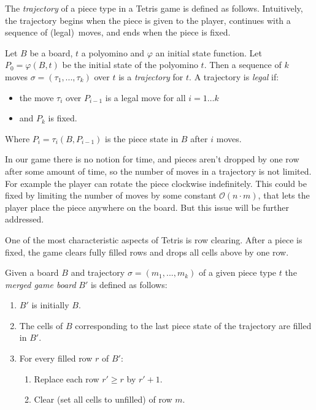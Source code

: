\vspace{10px}
The \emph{trajectory} of a piece type in a Tetris game is defined as follows. Intuitively, the trajectory begins when the piece is given to the player, continues with a sequence of (legal)~moves, and ends when the piece is fixed.  

\begin{definition} 
  Let $B$ be a board, $t$ a polyomino and $\varphi$ an initial state function. Let $P_0 = \varphi(B,t)$ be the initial state of the polyomino $t$. Then a sequence of $k$ moves $\sigma = (\tau_1, ..., \tau_k)$ over $t$ is a \emph{trajectory} for $t$. A trajectory is \emph{legal}  if:

 \begin{itemize}
   \item the move $\tau_{i}$ over $P_{i-1}$ is a legal move for all $i = 1 \dots k$
  \item and $P_k$ is fixed.
 \end{itemize}
 
 Where $P_{i} = \tau_{i}(B,P_{i-1})$ is the piece state in $B$ after $i$ moves.
\end{definition}

In our game there is no notion for time, and pieces aren't dropped by one row after some amount of time, so the number of moves in a trajectory is not limited. For example the player can rotate the piece clockwise indefinitely. This could be fixed by limiting the number of moves by some constant $\mathcal{O}(n \cdot m)$, that lets the player place the piece anywhere on the board. But this issue will be further addressed.

\vspace{1em}

One of the most characteristic aspects of Tetris is row clearing. After a piece is fixed, the game clears fully filled rows and drops all cells above by one row.  

\begin{definition}
  Given a board $B$ and trajectory $\sigma = (m_1, ..., m_k)$ of a given piece type $t$ the \emph{merged game board} $B'$ is defined as follows:
  \begin{enumerate}
    \item $B'$ is initially $B$.
    \item The cells of $B$ corresponding to the last piece state of the trajectory are filled in $B'$.
    \item For every filled row $r$ of $B'$:
      \begin{enumerate}
        \item Replace each row $r' \geq r$ by $r'+1$.
        \item Clear (set all cells to unfilled) of row $m$.
      \end{enumerate}
  \end{enumerate}
\end{definition}

